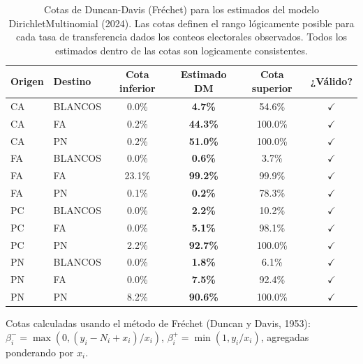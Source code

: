
\begin{table}[htbp]
\centering
\caption{Cotas de Duncan-Davis (Fréchet) para los estimados del modelo DirichletMultinomial (2024). Las cotas definen el rango lógicamente posible para cada tasa de transferencia dados los conteos electorales observados. Todos los estimados dentro de las cotas son logicamente consistentes.}
\label{tab:duncan_davis_bounds}
\small
\begin{tabular}{llcccc}
\toprule
Origen & Destino & Cota inferior & Estimado DM & Cota superior & ¿Válido? \\
\midrule
\textsc{CA} & BLANCOS & 0.0\% & \textbf{4.7\%} & 54.6\% & $\checkmark$ \\
\textsc{CA} & FA & 0.2\% & \textbf{44.3\%} & 100.0\% & $\checkmark$ \\
\textsc{CA} & PN & 0.2\% & \textbf{51.0\%} & 100.0\% & $\checkmark$ \\
\textsc{FA} & BLANCOS & 0.0\% & \textbf{0.6\%} & 3.7\% & $\checkmark$ \\
\textsc{FA} & FA & 23.1\% & \textbf{99.2\%} & 99.9\% & $\checkmark$ \\
\textsc{FA} & PN & 0.1\% & \textbf{0.2\%} & 78.3\% & $\checkmark$ \\
\textsc{PC} & BLANCOS & 0.0\% & \textbf{2.2\%} & 10.2\% & $\checkmark$ \\
\textsc{PC} & FA & 0.0\% & \textbf{5.1\%} & 98.1\% & $\checkmark$ \\
\textsc{PC} & PN & 2.2\% & \textbf{92.7\%} & 100.0\% & $\checkmark$ \\
\textsc{PN} & BLANCOS & 0.0\% & \textbf{1.8\%} & 6.1\% & $\checkmark$ \\
\textsc{PN} & FA & 0.0\% & \textbf{7.5\%} & 92.4\% & $\checkmark$ \\
\textsc{PN} & PN & 8.2\% & \textbf{90.6\%} & 100.0\% & $\checkmark$ \\
\bottomrule
\end{tabular}
\begin{tablenotes}\small
\item Cotas calculadas usando el método de Fréchet (Duncan y Davis, 1953): $\beta^-_i = \max(0, (y_i - N_i + x_i)/x_i)$, $\beta^+_i = \min(1, y_i/x_i)$, agregadas ponderando por $x_i$.
\end{tablenotes}
\end{table}
